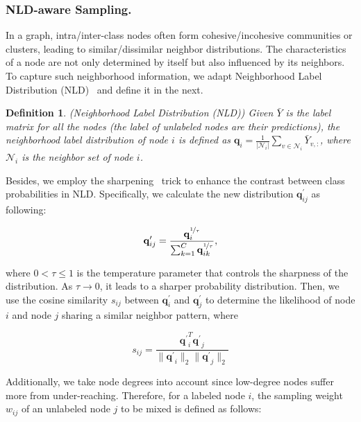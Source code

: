 \documentclass[letterpaper]{article} %
\newtheorem{definition}{Definition}
\newcommand{\aVec}[1]{\mathbf{#1}}
\begin{document}
\subsubsection{NLD-aware Sampling.}
In a graph, intra/inter-class nodes often form cohesive/incohesive communities or clusters, leading to similar/dissimilar neighbor distributions. The characteristics of a node are not only determined by itself but also influenced by its neighbors. To capture such neighborhood information, we adapt Neighborhood Label Distribution (NLD)~\cite{NLD} and define it in the next.
\begin{definition}{(Neighborhood Label Distribution (NLD))}
	 Given $\bar{Y}$ is the label matrix for all the nodes (the label of unlabeled nodes are their predictions), the neighborhood label distribution of node $i$ is defined as $\aVec{q}_{i} = \frac{1}{|\mathcal{N}_{i}|} \sum_{v \in \mathcal{N}_{i}} \bar{Y}_{v,:}$, where $\mathcal{N}_{i}$ is the neighbor set of node $i$.
\end{definition}
Besides, we employ the sharpening~\cite{sharp} trick to enhance the contrast between class probabilities in NLD. Specifically, we calculate the new distribution $\aVec{q}^{\prime}_{ij}$ as following:
\begin{small}
\begin{equation}
	\aVec{q}^{\prime}_{ij} = \frac{\aVec{q}^{\nicefrac{1}{\tau}}_{i}}{\sum_{k=1}^{C} \aVec{q}^{\nicefrac{1}{\tau}}_{ik}},
\end{equation}	
\end{small}where $0 < \tau \leq 1 $ is the temperature parameter that controls the sharpness of the distribution. As $\tau \to 0$, it leads to a sharper probability distribution. Then, we use the cosine similarity $s_{ij}$ between $\aVec{q}_{i}^{\prime}$ and $\aVec{q}_{j}^{\prime}$ to determine the likelihood of node $i$ and node $j$ sharing a similar neighbor pattern, where 
 \begin{small}
	\begin{equation}
	s_{ij} = \frac{\aVec{q^{\prime}}_{i}^{T}\aVec{q^{\prime}}_{j}}{\lVert \aVec{q^{\prime}}_{i} \rVert_{2} \lVert \aVec{q^{\prime}}_{j} \rVert_{2}}\end{equation}
\end{small}Additionally, we take node degrees into account since low-degree nodes suffer more from under-reaching. Therefore, for a labeled node $i$, the sampling weight $w_{ij}$ of an unlabeled node $j$ to be mixed is defined as follows:
\end{document}

